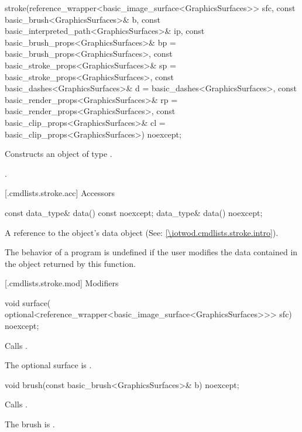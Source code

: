 %
\begin{itemdecl}
stroke(reference_wrapper<basic_image_surface<GraphicsSurfaces>> sfc,
  const basic_brush<GraphicsSurfaces>& b,
  const basic_interpreted_path<GraphicsSurfaces>& ip,
  const basic_brush_props<GraphicsSurfaces>& bp = 
  basic_brush_props<GraphicsSurfaces>{},
  const basic_stroke_props<GraphicsSurfaces>& sp = 
  basic_stroke_props<GraphicsSurfaces>{},
  const basic_dashes<GraphicsSurfaces>& d =
  basic_dashes<GraphicsSurfaces>{},
  const basic_render_props<GraphicsSurfaces>& rp = 
  basic_render_props<GraphicsSurfaces>{},
  const basic_clip_props<GraphicsSurfaces>& cl = 
  basic_clip_props<GraphicsSurfaces>{}) noexcept;
\end{itemdecl}
\begin{itemdescr}
\pnum
\effects Constructs an object of type .

\pnum
\postconditions {}.
\end{itemdescr}

 [\iotwod.cmdlists.stroke.acc] {Accessors}%

%
\begin{itemdecl}
const data_type& data() const noexcept;
data_type& data() noexcept;
\end{itemdecl}
\begin{itemdescr}
\pnum
\returns A reference to the  object's data object (See: \ref{\iotwod.cmdlists.stroke.intro}).

\pnum
\remarks The behavior of a program is undefined if the user modifies the data contained in the  object returned by this function.
\end{itemdescr}

 [\iotwod.cmdlists.stroke.mod] {Modifiers}%

%
\begin{itemdecl}
void surface(
  optional<reference_wrapper<basic_image_surface<GraphicsSurfaces>>> sfc) 
  noexcept;
\end{itemdecl}
\begin{itemdescr}
\pnum
\effects Calls .

\pnum
\remarks The optional surface is .
\end{itemdescr}

%
\begin{itemdecl}
void brush(const basic_brush<GraphicsSurfaces>& b) noexcept;
\end{itemdecl}
\begin{itemdescr}
\pnum
\effects Calls .

\pnum
\remarks The brush is .
\end{itemdescr}

